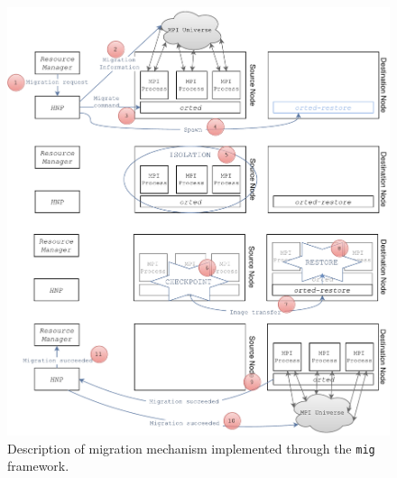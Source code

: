\begin{figure}[t!]
		\centerline 
{\includegraphics[scale=0.55]{img/cap4-migdescription.pdf}}
		\caption[The \texttt{mig} mechanism]{Description of migration mechanism implemented through the \texttt{mig} framework.}
		\label{fig:cap4-mighighlevel}
\end{figure}

